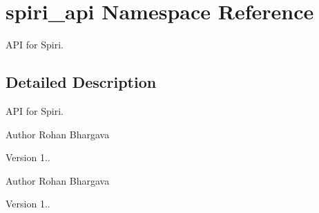 \hypertarget{namespacespiri__api}{\section{spiri\-\_\-api \-Namespace \-Reference}
\label{namespacespiri__api}
}


\-A\-P\-I for \-Spiri.  




\subsection{\-Detailed \-Description}
\-A\-P\-I for \-Spiri. \begin{DoxyAuthor}{\-Author}
\-Rohan \-Bhargava 
\end{DoxyAuthor}
\begin{DoxyVersion}{\-Version}
1..
\end{DoxyVersion}
\begin{DoxyAuthor}{\-Author}
\-Rohan \-Bhargava 
\end{DoxyAuthor}
\begin{DoxyVersion}{\-Version}
1.. 
\end{DoxyVersion}
